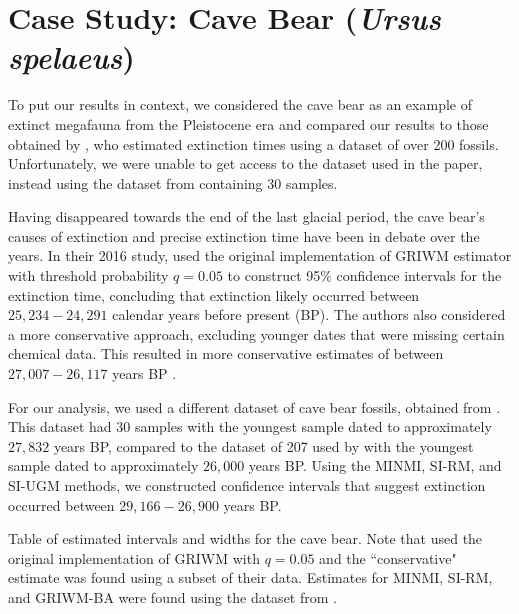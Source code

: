 \section{Case Study: Cave Bear (\textit{Ursus spelaeus})}

To put our results in context, we considered the cave bear as an example of extinct megafauna from the Pleistocene era and compared our results to those obtained by \citet{Baca2016}, who estimated extinction times using a dataset of over 200 fossils. Unfortunately, we were unable to get access to the dataset used in the paper, instead using the dataset from \citet{Cooper2015} containing 30 samples.

Having disappeared towards the end of the last glacial period, the cave bear's causes of extinction and precise extinction time have been in debate over the years. In their 2016 study, \citet{Baca2016} used the original implementation of GRIWM estimator with threshold probability $q = 0.05$ to construct 95\% confidence intervals for the extinction time, concluding that extinction likely occurred between $25,234 - 24,291$ calendar years before present (BP). The authors also considered a more conservative approach, excluding younger dates that were missing certain chemical data. This resulted in more conservative estimates of between $27,007 - 26,117$ years BP \cite{Baca2016}.

For our analysis, we used a different dataset of cave bear fossils, obtained from \citet{Cooper2015}. This dataset had 30 samples with the youngest sample dated to approximately $27,832$ years BP, compared to the dataset of 207 used by \citet{Baca2016} with the youngest sample dated to approximately $26,000$ years BP. Using the MINMI, SI-RM, and SI-UGM methods, we constructed confidence intervals that suggest extinction occurred between $29,166 - 26,900$ years BP.
\begin{table}[ht]
    \centering
    \caption{Table of estimated intervals and widths for the cave bear. Note that \citet{Baca2016} used the original implementation of GRIWM with $q=0.05$ and the ``conservative" estimate was found using a subset of their data. Estimates for MINMI, SI-RM, and GRIWM-BA were found using the dataset from \citet{Cooper2015}.}
    
    \label{tab:case-study-intervals}
    \vspace{-4mm}
\end{table}

